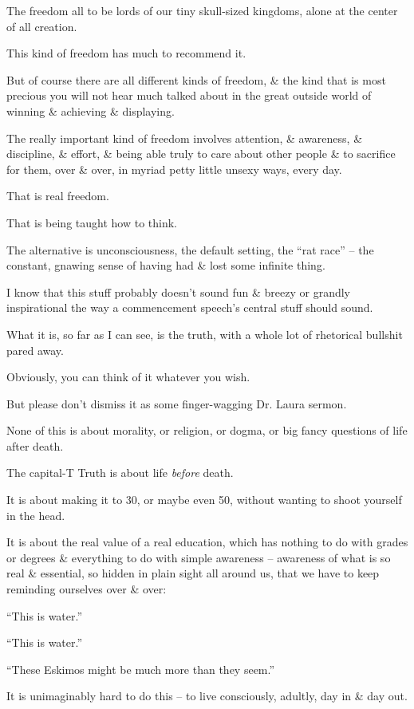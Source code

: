 \documentclass{article}
\begin{document}
The freedom all to be lords of our tiny skull-sized kingdoms, alone at the center of all creation.

This kind of freedom has much to recommend it.

But of course there are all different kinds of freedom, \& the kind that is most precious you will not hear much talked about in the great outside world of winning \& achieving \& displaying.

The really important kind of freedom involves attention, \& awareness, \& discipline, \& effort, \& being able truly to care about other people \& to sacrifice for them, over \& over, in myriad petty little unsexy ways, every day.

That is real freedom.

That is being taught how to think.

The alternative is unconsciousness, the default setting, the ``rat race'' -- the constant, gnawing sense of having had \& lost some infinite thing.

I know that this stuff probably doesn't sound fun \& breezy or grandly inspirational the way a commencement speech's central stuff should sound.

What it is, so far as I can see, is the truth, with a whole lot of rhetorical bullshit pared away.

Obviously, you can think of it whatever you wish.

But please don't dismiss it as some finger-wagging Dr. Laura sermon.

None of this is about morality, or religion, or dogma, or big fancy questions of life after death.

The capital-T Truth is about life {\it before} death.

It is about making it to 30, or maybe even 50, without wanting to shoot yourself in the head.

It is about the real value of a real education, which has nothing to do with grades or degrees \& everything to do with simple awareness -- awareness of what is so real \& essential, so hidden in plain sight all around us, that we have to keep reminding ourselves over \& over:

``This is water.''

``This is water.''

``These Eskimos might be much more than they seem.''

It is unimaginably hard to do this -- to live consciously, adultly, day in \& day out.
\end{document}
